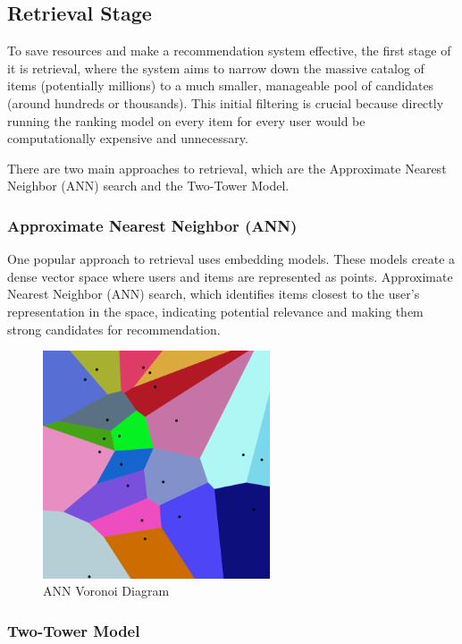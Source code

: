 \subsection{Retrieval Stage}

To save resources and make a recommendation system effective, the first stage of it is retrieval, 
where the system aims to narrow down the massive 
catalog of items (potentially millions) to a much smaller, 
manageable pool of candidates (around hundreds or thousands).
This initial filtering is crucial because 
directly running the ranking model on every item for every 
user would be computationally expensive and unnecessary.

There are two main approaches to retrieval, which are the Approximate Nearest Neighbor (ANN) search and the Two-Tower Model.

\subsubsection{Approximate Nearest Neighbor (ANN)}

One popular approach to retrieval uses embedding models. 
These models create a dense vector space where users and items are represented as points.
Approximate Nearest Neighbor (ANN) search,
which identifies items closest to the user's representation in the space, 
indicating potential relevance and making them strong candidates for recommendation.


\begin{figure}[H]
    \centering
    \includegraphics[width=0.6\textwidth]{assets/ann.png}
    \caption[ANN Voronoi Diagram]{ANN Voronoi Diagram \cite{AnnVoronoi}}
    \label{fig:AnnVoronoi}
\end{figure}

\subsubsection{Two-Tower Model}


